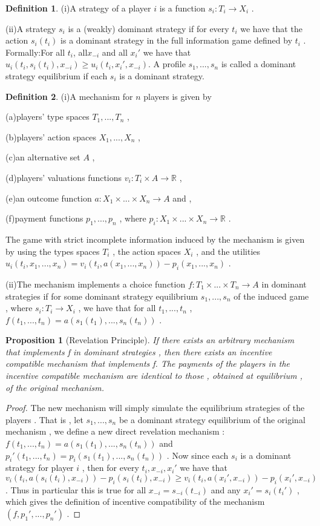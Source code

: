 \documentclass[10pt,reqno]{amsart}
\newtheorem{pro}{Proposition}[section]
\theoremstyle{definition}
\newtheorem{defn}{Definition}[section]
\theoremstyle{remark}
\numberwithin{equation}{section}
\begin{document}
\begin{defn}
(i)A strategy of a player $i$ is a function $s_i:T_i\rightarrow X_i$ .

(ii)A strategy $s_i$ is a (weakly) dominant strategy if for every $t_i$ we have that the action $s_i(t_i)$ is a dominant strategy in the full information game defined by $t_i$ . Formally:For all $t_i$, all$x_{-i}$ and all $x_i'$ we have that $u_i(t_i,s_i(t_i),x_{-i})\ge u_i(t_i,x_i',x_{-i})$. A profile $s_1,...,s_n$ is called a dominant strategy equilibrium if each $s_i$ is a dominant strategy.
\end{defn}

\begin{defn}
(i)A mechanism for $n$ players is given by

(a)players' type spaces $T_1,...,T_n$ ,

(b)players' action spaces $X_1,...,X_n$ ,

(c)an alternative set $A$ ,

(d)players' valuations functions $v_i:T_i\times A\rightarrow\mathbb{R}$ ,

(e)an outcome function $a:X_1\times...\times X_n\rightarrow A$ and ,

(f)payment functions $p_1,...,p_n$ , where $p_i:X_1\times...\times X_n\rightarrow\mathbb{R}$ .

The game with strict incomplete information induced by the mechanism is given by using the types spaces $T_i$ , the action spaces $X_i$ , and the utilities $u_i(t_i,x_1,...,x_n)=v_i(t_i,a(x_1,...,x_n))-p_i(x_1,...,x_n)$ .

(ii)The mechanism implements a choice function $f:T_1\times...\times T_n\rightarrow A$ in dominant strategies if for some dominant strategy equilibrium $s_1,...,s_n$ of the induced game , where $s_i:T_i\rightarrow X_i$ , we have that for all $t_1,...,t_n$ , $f(t_1,...,t_n)=a(s_1(t_1),...,s_n(t_n))$ .

\end{defn}

\begin{pro}[Revelation Principle]
If there exists an arbitrary mechanism that implements f in dominant strategies , then there exists an incentive compatible mechanism that implements f. The payments of the players in the incentive compatible mechanism are identical to those , obtained at equilibrium , of the original mechanism.
\end{pro}

\begin{proof}
The new mechanism will simply simulate the equilibrium strategies of the players . That is , let $s_1,...,s_n$ be a dominant strategy equilibrium of the original mechanism , we define a new direct revelation mechanism : $f(t_1,...,t_n)=a(s_1(t_1),...,s_n(t_n))$ and $p_i'(t_1,...,t_n)=p_i(s_1(t_1),...,s_n(t_n))$ . Now since each $s_i$ is a dominant strategy for player $i$ , then for every $t_i,x_{-i},x_i'$ we have that $v_i(t_i,a(s_i(t_i),x_{-i}))-p_i(s_i(t_i),x_{-i})\ge v_i(t_i,a(x_i',x_{-i}))-p_i(x_i',x_{-i})$ . Thus in particular this is true for all $x_{-i}=s_{-i}(t_{-i})$ and any $x_i'=s_i(t_i')$ , which gives the definition of incentive compatibility of the mechanism $(f,p_1',...,p_n')$ .

\end{proof}
\end{document}
